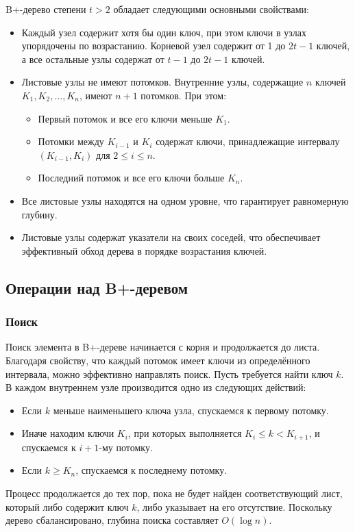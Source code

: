 \documentclass[10pt,a4paper,final]{article} %
\begin{document}
B+-дерево степени $t > 2$ обладает следующими основными свойствами:
\begin{itemize}
	\item Каждый узел содержит хотя бы один ключ, при этом ключи в узлах упорядочены по возрастанию. Корневой узел содержит от 1 до $2t - 1$ ключей, а все остальные узлы содержат от $t - 1$ до $2t - 1$ ключей.
	\item Листовые узлы не имеют потомков. Внутренние узлы, содержащие $n$ ключей $K_1, K_2, ..., K_n$, имеют $n + 1$ потомков. При этом:
	\begin{itemize}
		\item Первый потомок и все его ключи меньше $K_1$.
		\item Потомки между $K_{i-1}$ и $K_i$ содержат ключи, принадлежащие интервалу $(K_{i-1}, K_i)$ для $2 \leq i \leq n$.
		\item Последний потомок и все его ключи больше $K_n$.
	\end{itemize}
	\item Все листовые узлы находятся на одном уровне, что гарантирует равномерную глубину.
	\item Листовые узлы содержат указатели на своих соседей, что обеспечивает эффективный обход дерева в порядке возрастания ключей.
\end{itemize}

\subsection{Операции над B+-деревом}
\subsubsection{Поиск}
Поиск элемента в B+-дереве начинается с корня и продолжается до листа. Благодаря свойству, что каждый потомок имеет ключи из определённого интервала, можно эффективно направлять поиск. Пусть требуется найти ключ $k$. В каждом внутреннем узле производится одно из следующих действий:
\begin{itemize}
	\item Если $k$ меньше наименьшего ключа узла, спускаемся к первому потомку.
	\item Иначе находим ключи $K_i$, при которых выполняется $K_i \leq k < K_{i+1}$, и спускаемся к $i+1$-му потомку.
	\item Если $k \geq K_n$, спускаемся к последнему потомку.
\end{itemize}
Процесс продолжается до тех пор, пока не будет найден соответствующий лист, который либо содержит ключ $k$, либо указывает на его отсутствие. Поскольку дерево сбалансировано, глубина поиска составляет $O(\log n)$.
\end{document}
